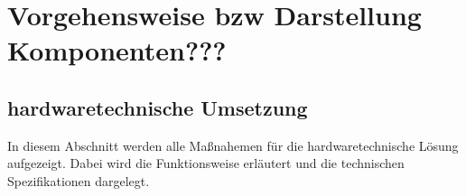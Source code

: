 \chapter{Vorgehensweise bzw Darstellung Komponenten???}

\section{hardwaretechnische Umsetzung}
In diesem Abschnitt werden alle Maßnahemen für die hardwaretechnische Lösung aufgezeigt. Dabei wird die Funktionsweise erläutert und die technischen Spezifikationen dargelegt.

